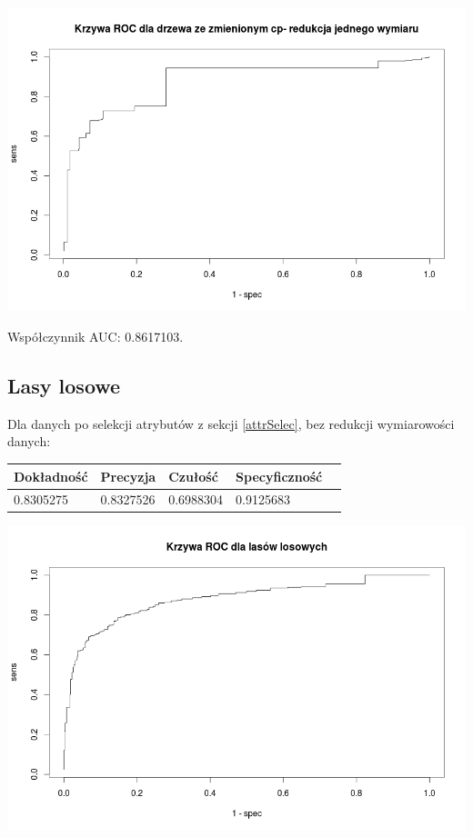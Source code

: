 \documentclass{article}
\begin{document}
\begin{center}
	\includegraphics[scale=0.40]{images/cptree2.png}
\end{center}

Współczynnik AUC: 0.8617103.

\subsection{Lasy losowe}

Dla danych po selekcji atrybutów z sekcji \ref{attrSelec}, bez redukcji wymiarowości danych:

\begin{center}
    \begin{tabular}{| l | l | l | l | l|}
    \hline
        Dokładność &  Precyzja &  Czułość & Specyficzność \\ \hline
      	0.8305275 & 0.8327526 & 0.6988304 & 0.9125683 \\
    \hline
    \end{tabular}
\end{center}

\begin{center}
	\includegraphics[scale=0.40]{images/forestNoPCA.png}
\end{center}
\end{document}
